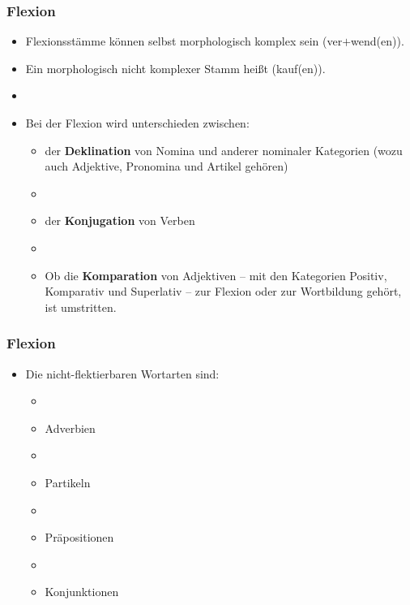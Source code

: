 \begin{frame}
\frametitle{Flexion}

\begin{itemize}
\item Flexionsstämme können selbst morphologisch komplex sein (ver$+$wend(en)).
\item Ein morphologisch nicht komplexer Stamm heißt  (kauf(en)).
\item[] 
\item Bei der Flexion wird unterschieden zwischen:

\begin{itemize}
	\item der \textbf{Deklination} von Nomina und anderer nominaler Kategorien (wozu auch Adjektive, Pronomina und Artikel gehören)
	\item[]
	\item der \textbf{Konjugation} von Verben 
	\item[]
	\item Ob die \textbf{Komparation} von Adjektiven -- mit den Kategorien Positiv, Komparativ und Superlativ -- zur Flexion oder zur Wortbildung gehört, ist umstritten.
\end{itemize}

\end{itemize}

\end{frame}




\begin{frame}
\frametitle{Flexion}

\begin{itemize}
\item Die nicht-flektierbaren Wortarten sind:

\begin{itemize}
\item[]
\item Adverbien
\item[]
\item Partikeln
\item[]
\item Präpositionen
\item[]
\item Konjunktionen
\end{itemize}
\end{itemize}


\end{frame}



